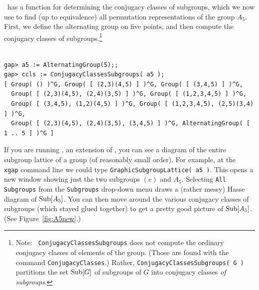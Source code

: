 \gap\ has a function for determining the conjugacy classes of
subgroups, which we now use to find (up to equivalence) all permutation
representations of the group $A_5$.
First, we define the alternating group on five points, and then
compute the conjugacy classes of subgroups.\footnote{Note: {\tt
    ConjugacyClassesSubgroups} does not compute the ordinary conjugacy classes of
  elements of the group. (Those are found with the command {\tt ConjugacyClasses}.)
  Rather, {\tt ConjugacyClassesSubgroups( G )} partitions the set $\mathrm{Sub}[G]$ of
  subgroups of $G$ into conjugacy classes \emph{of subgroups}.} 

{\codesize 
\begin{verbatim}

gap> a5 := AlternatingGroup(5);;
gap> ccls := ConjugacyClassesSubgroups( a5 );
[ Group( () )^G, Group( [ (2,3)(4,5) ] )^G, Group( [ (3,4,5) ] )^G, 
  Group( [ (2,3)(4,5), (2,4)(3,5) ] )^G, Group( [ (1,2,3,4,5) ] )^G, 
  Group( [ (3,4,5), (1,2)(4,5) ] )^G, Group( [ (1,2,3,4,5), (2,5)(3,4) ] )^G, 
  Group( [ (2,3)(4,5), (2,4)(3,5), (3,4,5) ] )^G, AlternatingGroup( [ 1 .. 5 ] )^G ]

\end{verbatim}}

\noindent If you are running \xgap, an extension of \gap, you can see a diagram of the entire
subgroup lattice of a group (of reasonably small order).  For example, at the {\tt
  xgap} command line we could type {\tt GraphicSubgroupLattice( a5 )}.  This opens a
new window showing just the two subgroups $(e)$ and $A_5$.  Selecting {\tt All
  Subgroups} from the {\tt Subgroups} drop-down menu draws a (rather messy) Hasse
diagram of $\mathrm{Sub}[A_5]$.  You can then move around the various conjugacy classes of
subgroups (which stayed glued together) to get a pretty good picture of
$\mathrm{Sub}[A_5]$. (See Figure~\ref{fig:A5new}.)

